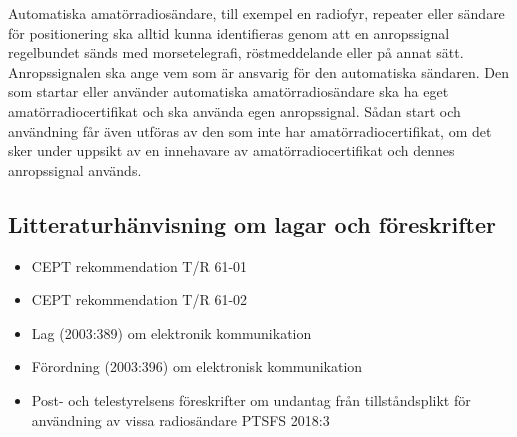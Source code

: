 Automatiska amatörradiosändare, till exempel en radiofyr, repeater eller
sändare för positionering ska alltid kunna identifieras genom att en
anropssignal regelbundet sänds med morsetelegrafi, röstmeddelande eller
på annat sätt.
Anropssignalen ska ange vem som är ansvarig för den automatiska sändaren.
Den som startar eller använder automatiska amatörradiosändare ska ha eget
amatörradiocertifikat och ska använda egen anropssignal.
Sådan start och användning får även utföras av den som inte har
amatörradiocertifikat, om det sker under uppsikt av en innehavare av
amatörradiocertifikat och dennes anropssignal används.

\subsection{Litteraturhänvisning om lagar och föreskrifter}

\begin{itemize}
\item CEPT rekommendation T/R 61-01 \cite{TR6101}
\item CEPT rekommendation T/R 61-02 \cite{TR6102}
\item Lag (2003:389) om elektronik kommunikation \cite{SFS2003:389}
\item Förordning (2003:396) om elektronisk kommunikation \cite{SFS2003:396}
\item Post- och telestyrelsens föreskrifter om undantag från tillståndsplikt för
användning av vissa radiosändare PTSFS 2018:3 \cite{PTSFS2018:3}
\end{itemize}
